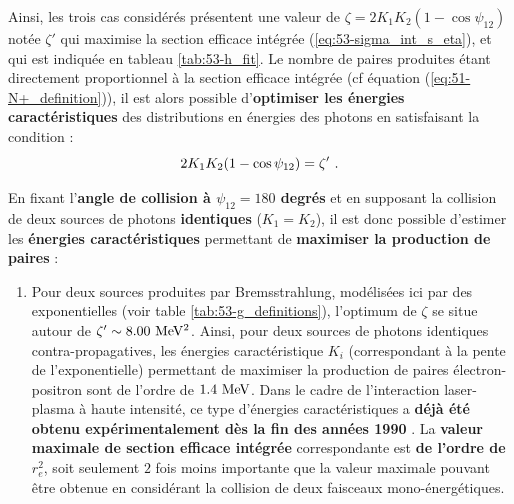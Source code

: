 \begin{refsection}
Ainsi, les trois cas considérés présentent une valeur de $\zeta=2 K_1 K_2 (1-\cos\psi_{12})$ notée $\zeta'$ qui maximise la section efficace intégrée (\ref{eq:53-sigma_int_s_eta}), et qui est indiquée en tableau \ref{tab:53-h_fit}. Le nombre de paires produites étant directement proportionnel à la section efficace intégrée (cf équation (\ref{eq:51-N+_definition})), il est alors possible d'\textbf{optimiser les énergies caractéristiques} des distributions en énergies des photons en satisfaisant la condition :
\begin{equation}
2 K_1 K_2 (1-\cos\psi_{12})=\zeta' ~ \rm .
\end{equation}


En fixant l'\textbf{angle de collision à $\psi_{12}=180$ degrés} et en supposant la collision de deux sources de photons \textbf{identiques} ($K_1=K_2$), il est donc possible d'estimer les \textbf{énergies caractéristiques} permettant de \textbf{maximiser la production de paires} :

\begin{enumerate}[label={\Roman*. }]
    \item Pour deux sources produites par Bremsstrahlung, modélisées ici par des exponentielles (voir table \ref{tab:53-g_definitions}), l'optimum de $\zeta$ se situe autour de $\zeta' \sim 8.00 ~ \rm MeV^2$. Ainsi, pour deux sources de photons identiques contra-propagatives, les énergies caractéristique $K_i$ (correspondant à la pente de l'exponentielle) permettant de maximiser la production de paires électron-positron sont de l'ordre de $1.4 ~ \rm MeV$. Dans le cadre de l'interaction laser-plasma à haute intensité, ce type d'énergies caractéristiques a \textbf{déjà été obtenu expérimentalement dès la fin des années 1990} \parencite{norreys_1999}. La \textbf{valeur maximale de section efficace intégrée} correspondante est \textbf{de l'ordre de $r_e^2$}, soit seulement $2$ fois moins importante que la valeur maximale pouvant être obtenue en considérant la collision de deux faisceaux mono-énergétiques.
    

\end{enumerate}
\end{refsection}
